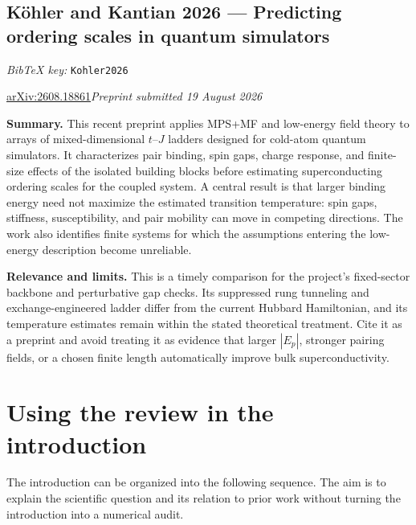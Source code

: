 \documentclass[11pt]{article}
\newcommand{\paper}[2]{\Needspace{8\baselineskip}\subsection{#2}\label{paper:#1}\textit{BibTeX key:} \texttt{#1}\quad\citep{#1}\par}
\newcommand{\arxiv}[1]{\href{https://arxiv.org/abs/#1}{arXiv:#1}}
\newcommand{\summary}{\par\textbf{Summary.} }
\newcommand{\relevance}{\par\textbf{Relevance and limits.} }
\begin{document}
\paper{Kohler2026}{K\"ohler and Kantian 2026 --- Predicting ordering scales in quantum simulators}
\arxiv{2608.18861}\quad\textit{Preprint submitted 19 August 2026}
\summary This recent preprint applies MPS+MF and low-energy field theory to arrays of mixed-dimensional $t$--$J$ ladders designed for cold-atom quantum simulators. It characterizes pair binding, spin gaps, charge response, and finite-size effects of the isolated building blocks before estimating superconducting ordering scales for the coupled system. A central result is that larger binding energy need not maximize the estimated transition temperature: spin gaps, stiffness, susceptibility, and pair mobility can move in competing directions. The work also identifies finite systems for which the assumptions entering the low-energy description become unreliable.
\relevance This is a timely comparison for the project's fixed-sector backbone and perturbative gap checks. Its suppressed rung tunneling and exchange-engineered ladder differ from the current Hubbard Hamiltonian, and its temperature estimates remain within the stated theoretical treatment. Cite it as a preprint and avoid treating it as evidence that larger $|E_p|$, stronger pairing fields, or a chosen finite length automatically improve bulk superconductivity.

\section{Using the review in the introduction}
The introduction can be organized into the following sequence. The aim is to explain the scientific question and its relation to prior work without turning the introduction into a numerical audit.
\end{document}
